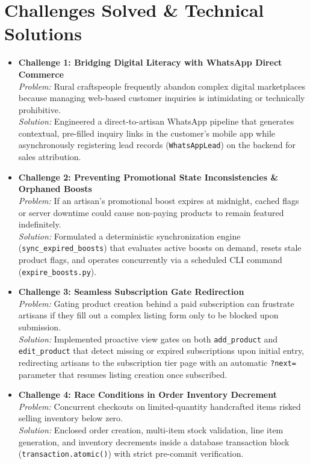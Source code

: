 \documentclass[12pt,a4paper]{article}
\begin{document}
\section{Challenges Solved \& Technical Solutions}
\begin{itemize}
    \item \textbf{Challenge 1: Bridging Digital Literacy with WhatsApp Direct Commerce}\\
    \emph{Problem:} Rural craftspeople frequently abandon complex digital marketplaces because managing web-based customer inquiries is intimidating or technically prohibitive.\\
    \emph{Solution:} Engineered a direct-to-artisan WhatsApp pipeline that generates contextual, pre-filled inquiry links in the customer's mobile app while asynchronously registering lead records (\texttt{WhatsAppLead}) on the backend for sales attribution.
    
    \item \textbf{Challenge 2: Preventing Promotional State Inconsistencies \& Orphaned Boosts}\\
    \emph{Problem:} If an artisan's promotional boost expires at midnight, cached flags or server downtime could cause non-paying products to remain featured indefinitely.\\
    \emph{Solution:} Formulated a deterministic synchronization engine (\texttt{sync\_expired\_boosts}) that evaluates active boosts on demand, resets stale product flags, and operates concurrently via a scheduled CLI command (\texttt{expire\_boosts.py}).

    \item \textbf{Challenge 3: Seamless Subscription Gate Redirection}\\
    \emph{Problem:} Gating product creation behind a paid subscription can frustrate artisans if they fill out a complex listing form only to be blocked upon submission.\\
    \emph{Solution:} Implemented proactive view gates on both \texttt{add\_product} and \texttt{edit\_product} that detect missing or expired subscriptions upon initial entry, redirecting artisans to the subscription tier page with an automatic \texttt{?next=} parameter that resumes listing creation once subscribed.

    \item \textbf{Challenge 4: Race Conditions in Order Inventory Decrement}\\
    \emph{Problem:} Concurrent checkouts on limited-quantity handcrafted items risked selling inventory below zero.\\
    \emph{Solution:} Enclosed order creation, multi-item stock validation, line item generation, and inventory decrements inside a database transaction block (\texttt{transaction.atomic()}) with strict pre-commit verification.
\end{itemize}
\end{document}
